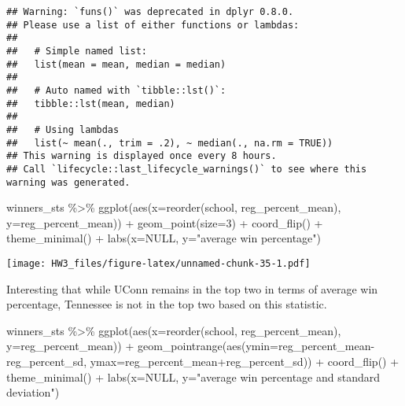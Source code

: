 \documentclass[
]{article}
\newenvironment{Shaded}{\begin{snugshade}}{\end{snugshade}}
\newcommand{\AttributeTok}[1]{\textcolor[rgb]{0.77,0.63,0.00}{#1}}
\newcommand{\ConstantTok}[1]{\textcolor[rgb]{0.00,0.00,0.00}{#1}}
\newcommand{\DecValTok}[1]{\textcolor[rgb]{0.00,0.00,0.81}{#1}}
\newcommand{\FunctionTok}[1]{\textcolor[rgb]{0.00,0.00,0.00}{#1}}
\newcommand{\NormalTok}[1]{#1}
\newcommand{\SpecialCharTok}[1]{\textcolor[rgb]{0.00,0.00,0.00}{#1}}
\newcommand{\StringTok}[1]{\textcolor[rgb]{0.31,0.60,0.02}{#1}}
\begin{document}
\begin{verbatim}
## Warning: `funs()` was deprecated in dplyr 0.8.0.
## Please use a list of either functions or lambdas: 
## 
##   # Simple named list: 
##   list(mean = mean, median = median)
## 
##   # Auto named with `tibble::lst()`: 
##   tibble::lst(mean, median)
## 
##   # Using lambdas
##   list(~ mean(., trim = .2), ~ median(., na.rm = TRUE))
## This warning is displayed once every 8 hours.
## Call `lifecycle::last_lifecycle_warnings()` to see where this warning was generated.
\end{verbatim}

\begin{Shaded}
\begin{Highlighting}[]
\NormalTok{winners\_sts }\SpecialCharTok{\%\textgreater{}\%} 
  \FunctionTok{ggplot}\NormalTok{(}\FunctionTok{aes}\NormalTok{(}\AttributeTok{x=}\FunctionTok{reorder}\NormalTok{(school, reg\_percent\_mean),}
             \AttributeTok{y=}\NormalTok{reg\_percent\_mean)) }\SpecialCharTok{+}
  \FunctionTok{geom\_point}\NormalTok{(}\AttributeTok{size=}\DecValTok{3}\NormalTok{) }\SpecialCharTok{+}
  \FunctionTok{coord\_flip}\NormalTok{() }\SpecialCharTok{+}
  \FunctionTok{theme\_minimal}\NormalTok{() }\SpecialCharTok{+}
  \FunctionTok{labs}\NormalTok{(}\AttributeTok{x=}\ConstantTok{NULL}\NormalTok{, }
       \AttributeTok{y=}\StringTok{"average win percentage"}\NormalTok{)}
\end{Highlighting}
\end{Shaded}

\texttt{[image: HW3\_files/figure-latex/unnamed-chunk-35-1.pdf]}

Interesting that while UConn remains in the top two in terms of average
win percentage, Tennessee is not in the top two based on this statistic.

\begin{Shaded}
\begin{Highlighting}[]
\NormalTok{winners\_sts }\SpecialCharTok{\%\textgreater{}\%} 
  \FunctionTok{ggplot}\NormalTok{(}\FunctionTok{aes}\NormalTok{(}\AttributeTok{x=}\FunctionTok{reorder}\NormalTok{(school, reg\_percent\_mean),}
             \AttributeTok{y=}\NormalTok{reg\_percent\_mean)) }\SpecialCharTok{+}
  \FunctionTok{geom\_pointrange}\NormalTok{(}\FunctionTok{aes}\NormalTok{(}\AttributeTok{ymin=}\NormalTok{reg\_percent\_mean}\SpecialCharTok{{-}}\NormalTok{reg\_percent\_sd,}
                      \AttributeTok{ymax=}\NormalTok{reg\_percent\_mean}\SpecialCharTok{+}\NormalTok{reg\_percent\_sd)) }\SpecialCharTok{+}
  \FunctionTok{coord\_flip}\NormalTok{() }\SpecialCharTok{+}
  \FunctionTok{theme\_minimal}\NormalTok{() }\SpecialCharTok{+}
  \FunctionTok{labs}\NormalTok{(}\AttributeTok{x=}\ConstantTok{NULL}\NormalTok{, }
       \AttributeTok{y=}\StringTok{"average win percentage and standard deviation"}\NormalTok{)}
\end{Highlighting}
\end{Shaded}
\end{document}
